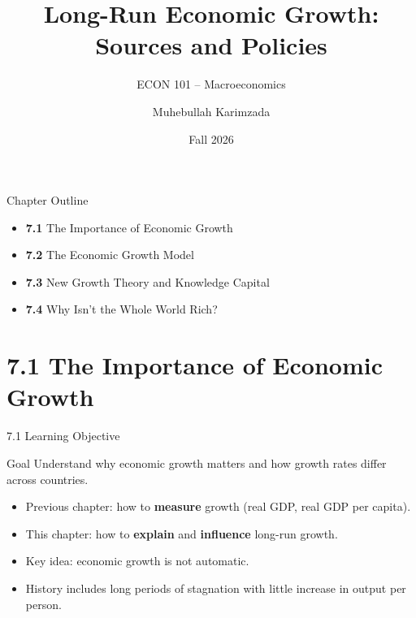 \documentclass[aspectratio=169]{beamer}
\title{\textbf{Long-Run Economic Growth: Sources and Policies}}
\subtitle{{\large ECON 101 -- Macroeconomics}}
\author{Muhebullah Karimzada}
\date{Fall 2026}
\begin{document}

\begin{frame}[plain]
  \titlepage
\end{frame}

\begin{frame}{Chapter Outline}
\transfade
\begin{itemize}[<+->]
  \item \textbf{7.1} The Importance of Economic Growth
  \item \textbf{7.2} The Economic Growth Model
  \item \textbf{7.3} New Growth Theory and Knowledge Capital
  \item \textbf{7.4} Why Isn't the Whole World Rich?
\end{itemize}
\end{frame}

\section{7.1 The Importance of Economic Growth}

\begin{frame}{7.1 Learning Objective}
\transfade
\begin{block}{Goal}
Understand why economic growth matters and how growth rates differ across countries.
\end{block}
\begin{itemize}[<+->]
  \item Previous chapter: how to \textbf{measure} growth (real GDP, real GDP per capita).
  \item This chapter: how to \textbf{explain} and \textbf{influence} long-run growth.
  \item Key idea: economic growth is \alert{not automatic}.
  \item History includes long periods of stagnation with little increase in output per person.
\end{itemize}
\end{frame}
\end{document}

